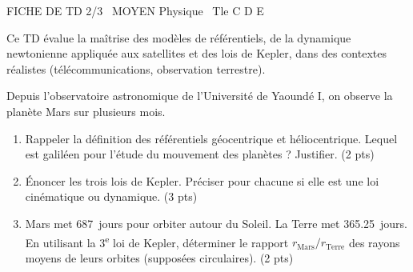 \documentclass[11pt]{article}
\begin{document}
\begin{tcolorbox}[enhanced,colback=popink,colframe=popink,arc=10pt,boxrule=0pt,left=12pt,right=12pt,top=9pt,bottom=9pt]
{\color{white}\popxbold\small FICHE DE TD 2/3 \textbullet\ MOYEN \hfill Physique \textbullet\ Tle C D E\par}
\end{tcolorbox}
\vspace{4pt}
Ce TD évalue la maîtrise des modèles de référentiels, de la dynamique newtonienne appliquée aux satellites et des lois de Kepler, dans des contextes réalistes (télécommunications, observation terrestre).

\begin{exercice}
Depuis l'observatoire astronomique de l'Université de Yaoundé I, on observe la planète Mars sur plusieurs mois.
\begin{enumerate}
    \item Rappeler la définition des référentiels géocentrique et héliocentrique. Lequel est galiléen pour l'étude du mouvement des planètes ? Justifier. (2 pts)
    \item Énoncer les trois lois de Kepler. Préciser pour chacune si elle est une loi cinématique ou dynamique. (3 pts)
    \item Mars met \SI{687}{jours} pour orbiter autour du Soleil. La Terre met \SI{365,25}{jours}. En utilisant la 3\textsuperscript{e} loi de Kepler, déterminer le rapport $r_{\text{Mars}}/r_{\text{Terre}}$ des rayons moyens de leurs orbites (supposées circulaires). (2 pts)
\end{enumerate}
\end{exercice}
\end{document}
